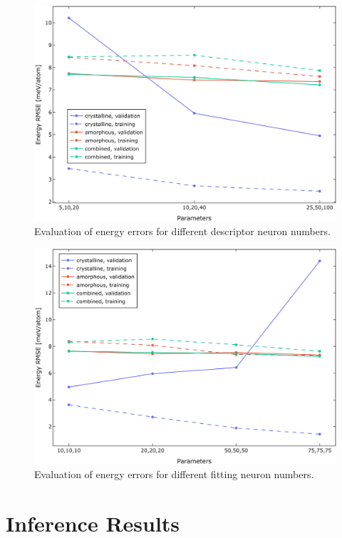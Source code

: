 \begin{figure}
  \begin{center}
    \includegraphics[width=.8\textwidth]{
      asset/descriptor_energy_error_evaluation.jpg
    }
  \end{center}
  \caption{Evaluation of energy errors for different descriptor neuron numbers.}
  \label{fig:descriptor_energy_error_evaluation}
\end{figure}

\begin{figure}
  \begin{center}
    \includegraphics[width=.8\textwidth]{
      asset/fitting_energy_error_evaluation.jpg
    }
  \end{center}
  \caption{Evaluation of energy errors for different fitting neuron numbers.}
  \label{fig:fitting_energy_error_evaluation}
\end{figure}

\section{Inference Results}
